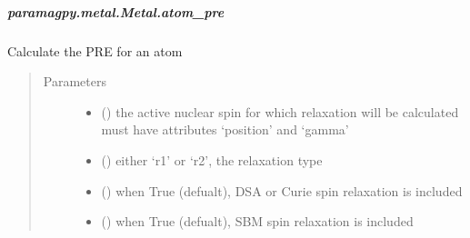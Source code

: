 \documentclass[a4paper,10pt,english,openany,oneside]{sphinxmanual}
\begin{document}
\begin{fulllineitems}
\begin{fulllineitems}
\begin{fulllineitems}
\end{fulllineitems}



\subparagraph{paramagpy.metal.Metal.atom\_pre}
\label{\detokenize{reference/generated/paramagpy.metal.Metal.atom_pre:paramagpy-metal-metal-atom-pre}}\label{\detokenize{reference/generated/paramagpy.metal.Metal.atom_pre::doc}}

\begin{fulllineitems}
\label{\detokenize{reference/generated/paramagpy.metal.Metal.atom_pre:paramagpy.metal.Metal.atom_pre}}
\sphinxAtStartPar
Calculate the PRE for an atom
\begin{quote}\begin{description}
\item[{Parameters}] \leavevmode\begin{itemize}
\item {} 
\sphinxAtStartPar
{} ({\hyperref[\detokenize{reference/generated/paramagpy.protein.CustomAtom:paramagpy.protein.CustomAtom}]{}}) \textendash{} the active nuclear spin for which relaxation will be calculated
must have attributes ‘position’ and ‘gamma’

\item {} 
\sphinxAtStartPar
{} () \textendash{} either ‘r1’ or ‘r2’, the relaxation type

\item {} 
\sphinxAtStartPar
{} (\sphinxstyleliteralemphasis{\sphinxupquote{ (}}\sphinxstyleliteralemphasis{\sphinxupquote{)}}) \textendash{} when True (defualt), DSA or Curie spin relaxation is included

\item {} 
\sphinxAtStartPar
{} (\sphinxstyleliteralemphasis{\sphinxupquote{ (}}\sphinxstyleliteralemphasis{\sphinxupquote{)}}) \textendash{} when True (defualt), SBM spin relaxation is included


\end{itemize}
\end{description}
\end{quote}
\end{fulllineitems}
\end{fulllineitems}
\end{fulllineitems}
\end{document}
